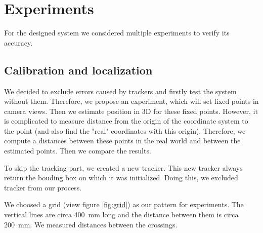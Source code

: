 \chapter{Experiments} 

For the designed system we considered multiple experiments to
verify its accuracy.

%
%
\section{Calibration and localization}

We decided to exclude errors caused by trackers and firstly test the system
without them. Therefore, we propose an experiment, which will set fixed points
in camera views. Then we estimate position in 3D for these fixed points.
However, it is complicated to measure distance from the origin of the
coordinate system to the point (and also find the "real" coordinates with this
origin). Therefore, we compute a distances between these points in the real
world and between the estimated points. Then we compare the results.
 
To skip the tracking part, we created a new tracker. This new tracker always
return the bouding box on which it was initialized. Doing this, we excluded
tracker from our process.

We choosed a grid (view figure \ref{fig:grid}) as our pattern for experiments.
The vertical lines are circa 400~mm long and the distance between them is circa
200~mm. We measured distances between the crossings. 

